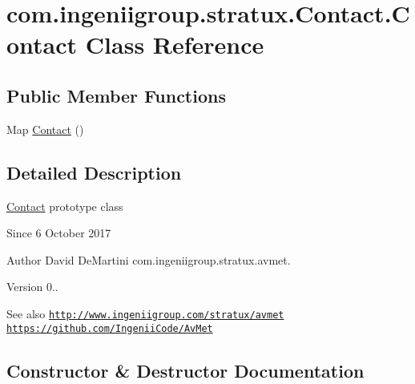 \hypertarget{classcom_1_1ingeniigroup_1_1stratux_1_1_contact_1_1_contact}{}\section{com.\+ingeniigroup.\+stratux.\+Contact.\+Contact Class Reference}
\label{classcom_1_1ingeniigroup_1_1stratux_1_1_contact_1_1_contact}
\subsection*{Public Member Functions}
\begin{DoxyCompactItemize}
\item 
Map \hyperlink{classcom_1_1ingeniigroup_1_1stratux_1_1_contact_1_1_contact_a0cae537e5ea0cf47e4cfc020f62a15a1}{Contact} ()
\end{DoxyCompactItemize}


\subsection{Detailed Description}
\hyperlink{classcom_1_1ingeniigroup_1_1stratux_1_1_contact_1_1_contact}{Contact} prototype class

\begin{DoxySince}{Since}
6 October 2017 
\end{DoxySince}
\begin{DoxyAuthor}{Author}
David De\+Martini  com.\+ingeniigroup.\+stratux.\+avmet. 
\end{DoxyAuthor}
\begin{DoxyVersion}{Version}
0.. 
\end{DoxyVersion}
\begin{DoxySeeAlso}{See also}
\href{http://www.ingeniigroup.com/stratux/avmet}{\tt http\+://www.\+ingeniigroup.\+com/stratux/avmet}  \href{https://github.com/IngeniiCode/AvMet}{\tt https\+://github.\+com/\+Ingenii\+Code/\+Av\+Met} 
\end{DoxySeeAlso}


\subsection{Constructor \& Destructor Documentation}
\mbox{\label{classcom_1_1ingeniigroup_1_1stratux_1_1_contact_1_1_contact_a0cae537e5ea0cf47e4cfc020f62a15a1}} 
